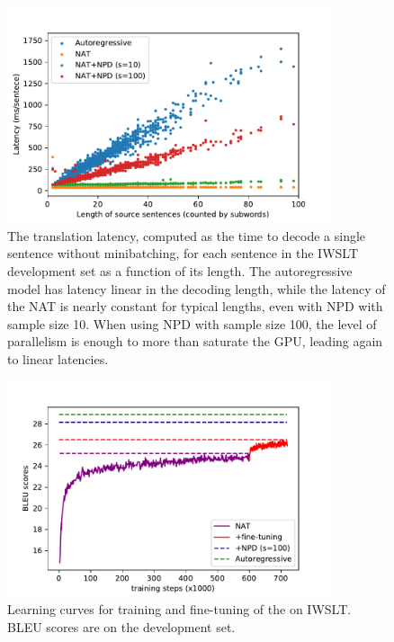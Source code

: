 \documentclass{article} %
\begin{document}
\begin{figure}[htbp]
\centering
\includegraphics[width=0.85\textwidth]{figures/length_vs_latency}
\caption{The translation latency, computed as the time to decode a single sentence without minibatching, for each sentence in the IWSLT development set as a function of its length. The autoregressive model has latency linear in the decoding length, while the latency of the NAT is nearly constant for typical lengths, even with NPD with sample size 10. When using NPD with sample size 100, the level of parallelism is enough to more than saturate the GPU, leading again to linear latencies.}
\end{figure}

\begin{figure}[htbp]
\centering
\includegraphics[width=0.85\textwidth]{figures/learning_curve}
\caption{Learning curves for training and fine-tuning of the \model{} on IWSLT. BLEU scores are on the development set.}
\end{figure}
\end{document}
